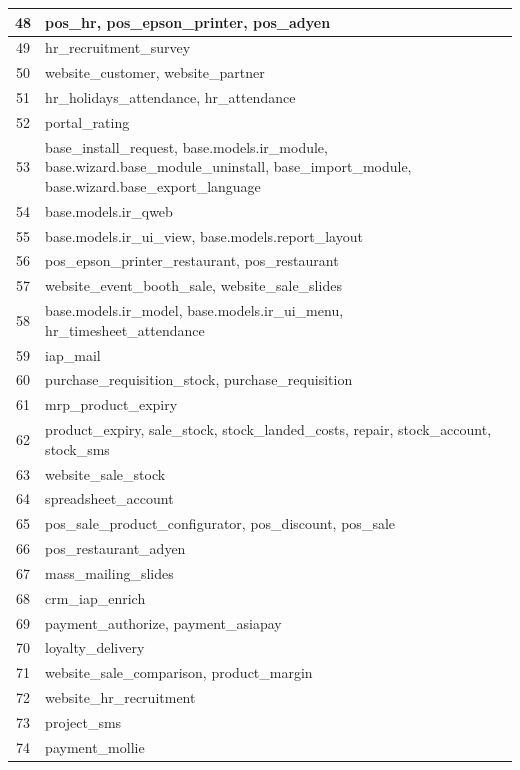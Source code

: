 \begin{small}
\begin{longtable}{|c|p{14cm}|}
48 & pos{\_}hr, pos{\_}epson{\_}printer, pos{\_}adyen \\ \hline
49 & hr{\_}recruitment{\_}survey \\ \hline
50 & website{\_}customer, website{\_}partner \\ \hline
51 & hr{\_}holidays{\_}attendance, hr{\_}attendance \\ \hline
52 & portal{\_}rating \\ \hline
53 & base{\_}install{\_}request, base.models.ir{\_}module, base.wizard.base{\_}module{\_}uninstall, base{\_}import{\_}module, base.wizard.base{\_}export{\_}language \\ \hline
54 & base.models.ir{\_}qweb \\ \hline
55 & base.models.ir{\_}ui{\_}view, base.models.report{\_}layout \\ \hline
56 & pos{\_}epson{\_}printer{\_}restaurant, pos{\_}restaurant \\ \hline
57 & website{\_}event{\_}booth{\_}sale, website{\_}sale{\_}slides \\ \hline
58 & base.models.ir{\_}model, base.models.ir{\_}ui{\_}menu, hr{\_}timesheet{\_}attendance \\ \hline
59 & iap{\_}mail \\ \hline
60 & purchase{\_}requisition{\_}stock, purchase{\_}requisition \\ \hline
61 & mrp{\_}product{\_}expiry \\ \hline
62 & product{\_}expiry, sale{\_}stock, stock{\_}landed{\_}costs, repair, stock{\_}account, stock{\_}sms \\ \hline
63 & website{\_}sale{\_}stock \\ \hline
64 & spreadsheet{\_}account \\ \hline
65 & pos{\_}sale{\_}product{\_}configurator, pos{\_}discount, pos{\_}sale \\ \hline
66 & pos{\_}restaurant{\_}adyen \\ \hline
67 & mass{\_}mailing{\_}slides \\ \hline
68 & crm{\_}iap{\_}enrich \\ \hline
69 & payment{\_}authorize, payment{\_}asiapay \\ \hline
70 & loyalty{\_}delivery \\ \hline
71 & website{\_}sale{\_}comparison, product{\_}margin \\ \hline
72 & website{\_}hr{\_}recruitment \\ \hline
73 & project{\_}sms \\ \hline
74 & payment{\_}mollie \\ \hline

\end{longtable}
\end{small}
